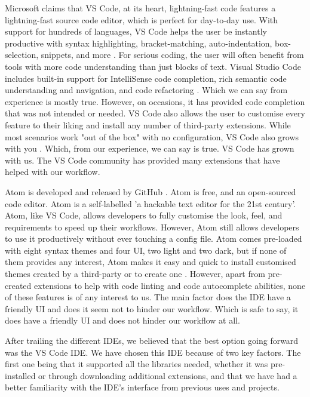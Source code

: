 	Microsoft claims that VS Code, at its heart, lightning-fast code features a lightning-fast source code editor, which is perfect for day-to-day use. With support for hundreds of languages, VS Code helps the user be instantly productive with syntax highlighting, bracket-matching, auto-indentation, box-selection, snippets, and more \cite{vs_code}. For serious coding, the user will often benefit from tools with more code understanding than just blocks of text. Visual Studio Code includes built-in support for IntelliSense code completion, rich semantic code understanding and navigation, and code refactoring \cite{vs_code}. Which we can say from experience is mostly true. However, on occasions, it has provided code completion that was not intended or needed. VS Code also allows the user to customise every feature to their liking and install any number of third-party extensions. While most scenarios work "out of the box" with no configuration, VS Code also grows with you \cite{vs_code}. Which, from our experience, we can say is true. VS Code has grown with us. The VS Code community has provided many extensions that have helped with our workflow. 
	
	Atom is developed and released by GitHub \cite{atom_explain}. Atom is free, and an open-sourced code editor. Atom is a self-labelled 'a hackable text editor for the 21st century'. Atom, like VS Code, allows developers to fully customise the look, feel, and requirements to speed up their workflows. However, Atom still allows developers to use it productively without ever touching a config file. Atom comes pre-loaded with eight syntax themes and four UI, two light and two dark, but if none of them provides any interest, Atom makes it easy and quick to install customised themes created by a third-party or to create one \cite{atom_explain}. However, apart from pre-created extensions to help with code linting and code autocomplete abilities, none of these features is of any interest to us. The main factor does the IDE have a friendly UI and does it seem not to hinder our workflow. Which is safe to say, it does have a friendly UI and does not hinder our workflow at all.
	
	After trailing the different IDEs, we believed that the best option going forward was the VS Code IDE. We have chosen this IDE because of two key factors. The first one being that it supported all the libraries needed, whether it was pre-installed or through downloading additional extensions, and that we have had a better familiarity with the IDE's interface from previous uses and projects.
	
